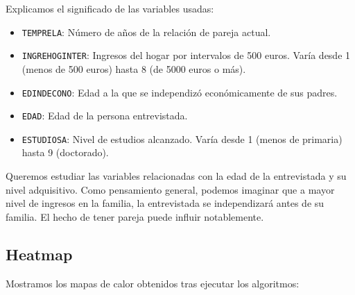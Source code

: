 	
	
	Explicamos el significado de las variables usadas:
	
	
	\begin{itemize}
		\item \texttt{TEMPRELA}: Número de años de la relación de pareja actual.
		\item \texttt{INGREHOGINTER}: Ingresos del hogar por intervalos de 500 euros. Varía desde 1 (menos de 500 euros) hasta 8 (de 5000 euros o más).
		\item \texttt{EDINDECONO}: Edad a la que se independizó económicamente de sus padres.
		\item \texttt{EDAD}: Edad de la persona entrevistada.
		\item \texttt{ESTUDIOSA}: Nivel de estudios alcanzado. Varía desde 1 (menos de primaria) hasta 9 (doctorado).
	\end{itemize}
	
	Queremos estudiar las variables relacionadas con la edad de la entrevistada
	y su nivel adquisitivo. Como pensamiento general, podemos imaginar que a mayor nivel de ingresos en la familia, la entrevistada se independizará antes de su familia. El hecho de tener pareja puede influir notablemente.
	
	\newpage 
	\subsection{Heatmap}
	Mostramos los mapas de calor obtenidos tras ejecutar los algoritmos:
	
	\begin{figure}[H]
		\centering
		
	\end{figure}
	
	
	\begin{figure}[H]
		\centering
		
		
	\end{figure}
	
	
	\begin{figure}[H]
		\centering
		
	\end{figure}

